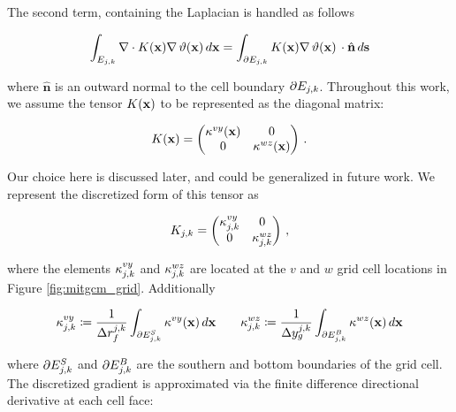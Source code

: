 The second term, containing the Laplacian is handled as follows
\begin{linenomath*}\begin{equation*}
    \int_{E_{j,k}} \nabla\cdot K(\mathbf{x})\nabla\,\vartheta(\mathbf{x})\,d\mathbf{x}
    =\int_{\partial E_{j,k}} K(\mathbf{x})\nabla\,\vartheta(\mathbf{x})\,
    \cdot \hat{\mathbf{n}} \, d\mathbf{s}
\end{equation*}\end{linenomath*}
where $\hat{\mathbf{n}}$ is an outward normal to the cell boundary
$\partial E_{j,k}$.
Throughout this work, we assume the tensor $K(\mathbf{x})$ to be represented as the
diagonal matrix:
\begin{linenomath*}\begin{equation*}
    K(\mathbf{x}) =
    \begin{pmatrix}
        \kappa^{vy}(\mathbf{x}) & 0 \\
        0 & \kappa^{wz}(\mathbf{x}) \\
    \end{pmatrix} \, .
\end{equation*}\end{linenomath*}
Our choice here is discussed later, and could be generalized in future work.
We represent the
discretized form of this tensor as
\begin{linenomath*}\begin{equation*}
    K_{j,k} =
    \begin{pmatrix}
        \kappa^{vy}_{j,k} & 0 \\
        0 & \kappa^{wz}_{j,k} \\
    \end{pmatrix} \, ,
\end{equation*}\end{linenomath*}
where the elements $\kappa^{vy}_{j,k}$ and $\kappa^{wz}_{j,k}$
are located at the $v$ and $w$ grid cell locations in Figure
\ref{fig:mitgcm_grid}.
Additionally
\begin{linenomath*}\begin{equation*}
    \kappa^{vy}_{{j,k}} \coloneqq \dfrac{1}{\Delta r_f^{{j,k}}}
    \int_{\partial E_{{j,k}}^{S}} \kappa^{vy}(\mathbf{x})\,d\mathbf{x}
    \qquad
    \kappa^{wz}_{{j,k}} \coloneqq \dfrac{1}{\Delta y_g^{{j,k}}}
    \int_{\partial E_{{j,k}}^{B}} \kappa^{wz}(\mathbf{x})\,d\mathbf{x}
\end{equation*}\end{linenomath*}
where $\partial E_{{j,k}}^{S}$ and $\partial E_{{j,k}}^{B}$ are the
southern and bottom boundaries of the grid cell.
The discretized gradient is approximated via the finite difference
directional derivative at each cell face:
